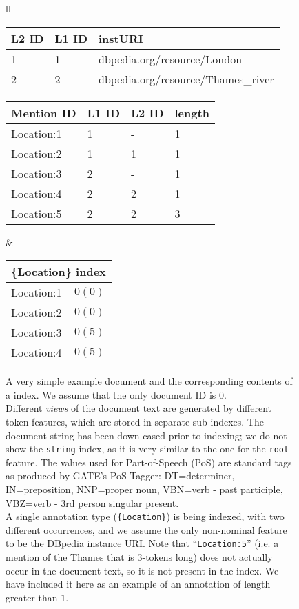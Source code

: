 \begin{figure*}[htb]
\begin{center}
{\begin{tabular}{ll}
{\smallskip

\begin{tabular}[t]{|l|l|l|}
\hline
{\bf L2 ID} & {\bf L1 ID} & {\bf instURI}\\
\hline
1 & 1 & dbpedia.org/resource/London \\ 
\hline
2 & 2 & dbpedia.org/resource/Thames\_river \\ 
\hline
\end{tabular}

\begin{tabular}[t]{|l|l|l|l|}
\hline
{\bf Mention ID} & {\bf L1 ID} & {\bf L2 ID} & {\bf length} \\
\hline
Location:1 & 1 & - & 1 \\
\hline
Location:2 & 1 & 1 & 1 \\ 
\hline
Location:3 & 2 & - & 1 \\
\hline
Location:4 & 2 & 2 & 1 \\
\hline
Location:5 & 2 & 2 & 3 \\ 
\hline
\end{tabular}
} &

\parbox[t]{14em} {

\begin{tabular}[t]{|l|l|}
\hline
\multicolumn{2}{|l|}{\bf \{Location\} index}\\
\hline
Location:1 & $0(0)$\\
\hline
Location:2 & $0(0)$\\
\hline
Location:3 & $0(5)$\\ 
\hline
Location:4 & $0(5)$\\ 
\hline
\end{tabular}
}
\end{tabular}
} 
\caption[\Mimir{} index contents]{A very simple example document and the
corresponding contents of a \Mimir{} index. We assume that the only document ID is $0$.\\
Different {\em views} of the document text are generated by different token
features, which are stored in separate sub-indexes. The document string has been
down-cased prior to indexing; we do not show the {\tt string} index, as it is
very similar to the one for the {\tt root} feature. The values used for
Part-of-Speech (PoS) are standard tags as produced by GATE's PoS Tagger:
DT=determiner, IN=preposition, NNP=proper noun, VBN=verb - past participle, 
VBZ=verb - 3rd person singular present.\\
A single annotation type ({\tt \{Location\}}) is being indexed, with two
different occurrences, and we assume the only non-nominal feature to be the
DBpedia instance URI. Note that ``{\tt Location:5}'' (i.e. a mention of the
Thames that is 3-tokens long) does not actually occur in the document text, so
it is not present in the index. We have included it here as an example of an
annotation of length greater than $1$.}
\label{fig:token-indexes}
\end{center}
\end{figure*}

